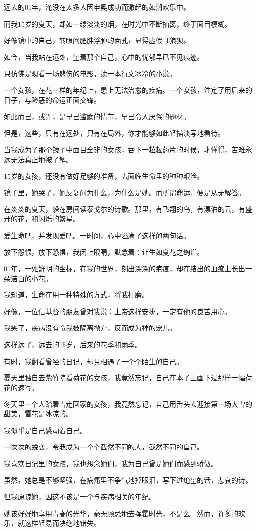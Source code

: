 \documentclass[12pt,a4paper]{article}
\begin{document}
		远去的01年，淹没在太多人因申奥成功而激起的如潮欢乐中。\par
		而我15岁的夏天，却如一缕淡淡的烟，在时光中不断抽离，终于面目模糊。\par
		好像镜中的自己，转眼间肥胖浮肿的面孔，显得虚假且狼狈。

		如今，当我站在远处，望着那个自己，心中的忧郁早已不见痕迹。\par
		只仿佛是观看一场悲伤的电影，读一本行文冰冷的小说。\par
		一个女孩，在花一样的年纪上，患上无法治愈的疾病。一个女孩，注定了用后来的日子，与险恶的命运正面交锋。\par
		如此而已，或许，是早已滥觞的情节，早已令人厌倦的题材。\par
		但是，这些，只有在远处，只有在局外，你才能够如此轻描淡写地看待。\par
		当我成为了那个镜子中面目全非的女孩，吞下一粒粒药片的时候，才懂得，苦难永远无法真正地被了解。

		15岁的女孩，还没有做好足够的准备，去面临生命里的种种艰险。\par
		镜子里，她哭了，她反复问为什么，为什么是她。而所谓命运，便是从无解答。\par
		在炎炎的夏天，躲在房间读泰戈尔的诗歌。那里，有飞翔的鸟，有漂泊的云，有盛开的花，和闪烁的繁星。\par
		爱生命吧，并发现爱吧。一时间，心中溢满了这样的两句话。\par
		放下怨恨，放下恐惧，我闭上眼睛，默念着：让生如夏花之绚烂。

		01年，一处鲜明的坐标，在我的世界，刻出深深的疤痕，却在结出的血痂上长出一朵洁白的小花。\par
		我知道，生命在用一种特殊的方式，将我打磨。\par
		好像，一位信基督的朋友曾对我说：上帝这样安排，一定有他的良苦用心。\par
		我笑了，疾病没有令我被隔离抛弃，反而成为神的宠儿。

		这样远了，远去的15岁，后来的花季和雨季。

		有时，我翻看曾经的日记，却只相遇了一个个陌生的自己。\par
		夏天里独自去紫竹院看荷花的女孩，我竟然忘记，自己在本子上画下过那样一幅荷花的速写。\par
		冬天里一个人踏着雪走回家的女孩，我竟然忘记，自己用舌头去迎接第一场大雪的甜美，雪花是冰凉的。

		我似乎是自己感动着自己。

		一次次的蜕变，令我成为一个个截然不同的人，截然不同的自己。\par
		我喜欢日记里的女孩，我也想念她们，我为自己曾是她们而感到骄傲。\par
		虽然，她总是不够坚强，在病痛里不争气地掉眼泪，写下过绝望的话，悲哀的诗。\par
		但我原谅她，因这不该是一个与疾病相关的年纪。\par
		她该好好地享用青春的光华，毫无顾忌地去挥霍时光，不是么。然而，许多的欢乐，就这样轻易而决绝地错失。
\end{document}
